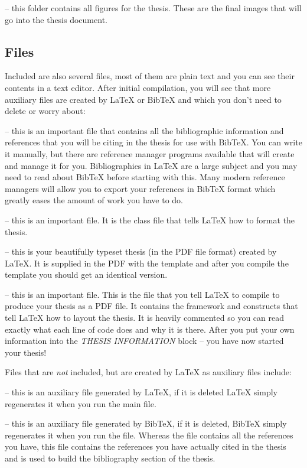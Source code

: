  -- this folder contains all figures for the thesis. These are the final images that will go into the thesis document.

\subsection{Files}

Included are also several files, most of them are plain text and you can see
their contents in a text editor. After initial compilation, you will see that
more auxiliary files are created by \LaTeX{} or BibTeX and which you don't need
to delete or worry about:

 -- this is an important file that contains all the
bibliographic information and references that you will be citing in the thesis
for use with BibTeX. You can write it manually, but there are reference manager
programs available that will create and manage it for you. Bibliographies in
\LaTeX{} are a large subject and you may need to read about BibTeX before
starting with this. Many modern reference managers will allow you to export your
references in BibTeX format which greatly eases the amount of work you have to
do.

 -- this is an important file. It is the
class file that tells \LaTeX{} how to format the thesis.

 -- this is your beautifully typeset thesis (in the PDF file
format) created by \LaTeX{}. It is supplied in the PDF with the template and
after you compile the template you should get an identical version.

 -- this is an important file. This is the file that you tell
\LaTeX{} to compile to produce your thesis as a PDF file. It contains the
framework and constructs that tell \LaTeX{} how to layout the thesis. It is
heavily commented so you can read exactly what each line of code does and why it
is there. After you put your own information into the \emph{THESIS INFORMATION}
block -- you have now started your thesis!

Files that are \emph{not} included, but are created by \LaTeX{} as auxiliary
files include:

 -- this is an auxiliary file generated by \LaTeX{}, if it is
deleted \LaTeX{} simply regenerates it when you run the main  file.

 -- this is an auxiliary file generated by BibTeX, if it is
deleted, BibTeX simply regenerates it when you run the  file.
Whereas the  file contains all the references you have, this
 file contains the references you have actually cited in the thesis
and is used to build the bibliography section of the thesis.

